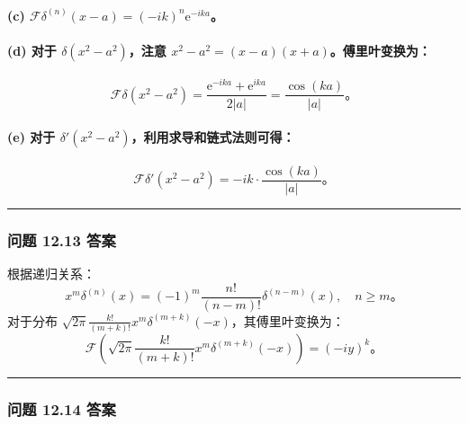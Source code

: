 \paragraph{\texorpdfstring{(c)
$\mathcal{F}\delta^{(n)}(x-a) = (-i k)^n \mathrm{e}^{-i k a}$。}{(c) \textbackslash mathcal\{F\}\textbackslash delta\^{}\{(n)\}(x-a) = (-i k)\^{}n \textbackslash mathrm\{e\}\^{}\{-i k a\}。}}\label{c-mathcalfdeltanx-a--i-kn-mathrme-i-k-a}

\paragraph{\texorpdfstring{(d) 对于 $\delta(x^2-a^2)$，注意
$x^2-a^2 = (x-a)(x+a)$。傅里叶变换为：}{(d) 对于 \textbackslash delta(x\^{}2-a\^{}2)，注意 x\^{}2-a\^{}2 = (x-a)(x+a)。傅里叶变换为：}}\label{d-ux5bf9ux4e8e-deltax2-a2ux6ce8ux610f-x2-a2-x-axaux5085ux91ccux53f6ux53d8ux6362ux4e3a}
 $$
\mathcal{F}\delta(x^2-a^2) = \frac{\mathrm{e}^{-i k a} + \mathrm{e}^{i k a}}{2|a|} = \frac{\cos(k a)}{|a|}。
$$
\paragraph{\texorpdfstring{(e) 对于
$\delta'(x^2-a^2)$，利用求导和链式法则可得：}{(e) 对于 \textbackslash delta\textegsingle(x\^{}2-a\^{}2)，利用求导和链式法则可得：}}\label{e-ux5bf9ux4e8e-deltax2-a2ux5229ux7528ux6c42ux5bfcux548cux94feux5f0fux6cd5ux5219ux53efux5f97}
 $$
\mathcal{F}\delta'(x^2-a^2) = -i k \cdot \frac{\cos(k a)}{|a|}。
$$
\begin{center}\rule{0.5\linewidth}{0.5pt}\end{center}

\subsubsection{问题 12.13 答案}\label{ux95eeux9898-12.13-ux7b54ux6848}

根据递归关系：
 $$
x^m \delta^{(n)}(x) = (-1)^m \frac{n!}{(n-m)!} \delta^{(n-m)}(x), \quad n \geq m。
$$
对于分布
$\sqrt{2 \pi} \frac{k!}{(m+k)!} x^m \delta^{(m+k)}(-x)$，其傅里叶变换为：
 $$
\mathcal{F}\left(\sqrt{2 \pi} \frac{k!}{(m+k)!} x^m \delta^{(m+k)}(-x)\right) = (-i y)^k。
$$
\begin{center}\rule{0.5\linewidth}{0.5pt}\end{center}

\subsubsection{问题 12.14 答案}\label{ux95eeux9898-12.14-ux7b54ux6848}

